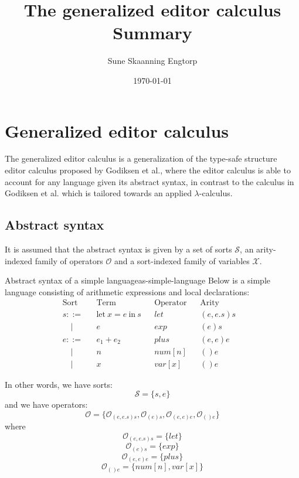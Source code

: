 \documentclass{article}
\title{The generalized editor calculus \\ Summary}
\date{\today}
\author{Sune Skaanning Engtorp}
\begin{document}
\maketitle

\section{Generalized editor calculus}
The generalized editor calculus\cite{aalborg} is a generalization of the type-safe structure editor calculus proposed by Godiksen et al.\cite{godiksen}, where the editor calculus is able to account for any language given its abstract syntax, in contrast to the calculus in Godiksen et al. which is tailored towards an applied $\lambda$-calculus.

\subsection{Abstract syntax}
It is assumed that the abstract syntax is given by a set of sorts $\mathcal{S}$, an arity-indexed family of operators $\mathcal{O}$ and a sort-indexed family of variables $\mathcal{X}$.

\begin{example}{Abstract syntax of a simple language}{as-simple-language}
Below is a simple language consisting of arithmetic expressions and local declarations:
\[
\begin{aligned}
&\text{Sort} &        &\text{Term} &          &\text{Operator} &         &\text{Arity}           &&\\
&s ::=         & &\text{let} \ x = e \ \text{in} \ s & &let & &(e,e.s)s    &&\\
&\quad |       & &e  &          &exp      &         &(e)s           &&\\
&e ::=         & &e_1 + e_2  &  &plus          & &(e,e)e            &&\\
&\quad |       & &n        & &num[n]          & &()e           &&\\
&\quad |       & &x        & &var[x]          & &()e
\end{aligned}
\]

In other words, we have sorts: $$\mathcal{S} = \{ s, e \}$$ and we have operators: $$\mathcal{O} = \{
 \mathcal{O}_{(e,e.s)s}, \mathcal{O}_{(e)s}, \mathcal{O}_{(e,e)e}, \mathcal{O}_{()e}\}$$ where $$\mathcal{O}_{(e,e.s)s} = \{ let \}$$ $$\mathcal{O}_{(e)s} = \{ exp \}$$ $$\mathcal{O}_{(e,e)e} = \{ plus \}$$ $$\mathcal{O}_{()e} = \{ num[n], var[x] \}$$

\end{example}
\end{document}
